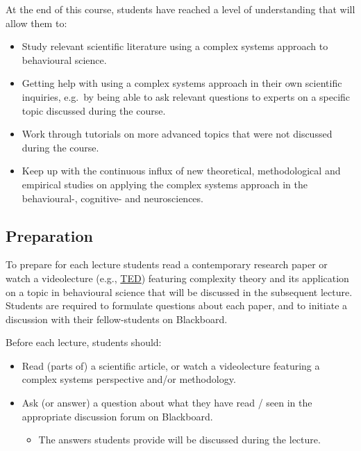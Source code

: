 \documentclass[12pt,]{book}
\providecommand{\tightlist}{%
  \setlength{\itemsep}{0pt}\setlength{\parskip}{0pt}}
\theoremstyle{definition}
\theoremstyle{definition}
\theoremstyle{definition}
\theoremstyle{remark}
\begin{document}
At the end of this course, students have reached a level of
understanding that will allow them to:

\begin{itemize}
\tightlist
\item
  Study relevant scientific literature using a complex systems approach
  to behavioural science.
\item
  Getting help with using a complex systems approach in their own
  scientific inquiries, e.g.~by being able to ask relevant questions to
  experts on a specific topic discussed during the course.
\item
  Work through tutorials on more advanced topics that were not discussed
  during the course.
\item
  Keep up with the continuous influx of new theoretical, methodological
  and empirical studies on applying the complex systems approach in the
  behavioural-, cognitive- and neurosciences.
\end{itemize}

\subsection*{Preparation}\label{preparation}

To prepare for each lecture students read a contemporary research paper
or watch a videolecture (e.g., \href{http://www.ted.com}{TED}) featuring
complexity theory and its application on a topic in behavioural science
that will be discussed in the subsequent lecture. Students are required
to formulate questions about each paper, and to initiate a discussion
with their fellow-students on Blackboard.

Before each lecture, students should:

\begin{itemize}
\tightlist
\item
  Read (parts of) a scientific article, or watch a videolecture
  featuring a complex systems perspective and/or methodology.
\item
  Ask (or answer) a question about what they have read / seen in the
  appropriate discussion forum on Blackboard.

  \begin{itemize}
  \tightlist
  \item
    The answers students provide will be discussed during the lecture.
  \end{itemize}
\end{itemize}
\end{document}
